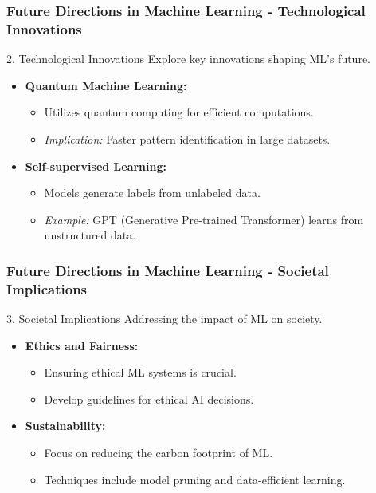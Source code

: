\documentclass[aspectratio=169]{beamer}
\begin{document}
\begin{frame}[fragile]
    \frametitle{Future Directions in Machine Learning - Technological Innovations}
    \begin{block}{2. Technological Innovations}
        Explore key innovations shaping ML's future.
    \end{block}
    \begin{itemize}
        \item \textbf{Quantum Machine Learning:}
        \begin{itemize}
            \item Utilizes quantum computing for efficient computations.
            \item \textit{Implication:} Faster pattern identification in large datasets.
        \end{itemize}
        
        \item \textbf{Self-supervised Learning:}
        \begin{itemize}
            \item Models generate labels from unlabeled data.
            \item \textit{Example:} GPT (Generative Pre-trained Transformer) learns from unstructured data.
        \end{itemize}
    \end{itemize}
\end{frame}

\begin{frame}[fragile]
    \frametitle{Future Directions in Machine Learning - Societal Implications}
    \begin{block}{3. Societal Implications}
        Addressing the impact of ML on society.
    \end{block}
    \begin{itemize}
        \item \textbf{Ethics and Fairness:}
        \begin{itemize}
            \item Ensuring ethical ML systems is crucial.
            \item Develop guidelines for ethical AI decisions.
        \end{itemize}

        \item \textbf{Sustainability:}
        \begin{itemize}
            \item Focus on reducing the carbon footprint of ML.
            \item Techniques include model pruning and data-efficient learning.
        \end{itemize}
    \end{itemize}
\end{frame}
\end{document}
